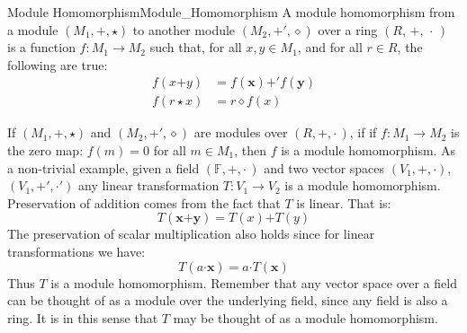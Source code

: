     \begin{fdefinition}{Module Homomorphism}{Module_Homomorphism}
        A \gls{module homomorphism} from a
        \gls{module} $(M_{1},\boldsymbol{+},\star)$ to another module
        $(M_{2},\boldsymbol{+}',\diamond)$ over a \gls{ring}
        $(R,\,+,\,\cdot\,)$ is a \gls{function} $f:M_{1}\rightarrow{M}_{2}$
        such that, for all $x,y\in{M}_{1}$, and for all $r\in{R}$, the
        following are true:
        \begin{align}
            f(x\boldsymbol{+}y)&=f(\mathbf{x})\boldsymbol{+}'f(\mathbf{y})
            \tag{Preservation of Addition}\\
            f(r\star{x})&=r\diamond{f}(x)
            \tag{Preservation of Scalar Multiplication}
        \end{align}
    \end{fdefinition}
    \begin{example}
        If $(M_{1},\boldsymbol{+},\star)$ and $(M_{2},\boldsymbol{+}',\diamond)$
        are modules over $(R,+,\cdot\,)$, if if $f:M_{1}\rightarrow{M}_{2}$ is
        the zero map: $f(m)=0$ for all $m\in{M}_{1}$, then $f$ is a module
        homomorphism. As a non-trivial example, given a field
        $(\mathbb{F},+,\cdot\,)$ and two vector spaces
        $(V_{1},\boldsymbol{+},\boldsymbol{\cdot})$,
        $(V_{1},\boldsymbol{+}',\boldsymbol{\cdot}')$ any linear transformation
        $T:V_{1}\rightarrow{V}_{2}$ is a module homomorphism. Preservation of
        addition comes from the fact that $T$ is linear. That is:
        \begin{equation}
            T(\mathbf{x}\boldsymbol{+}\mathbf{y})
            =T(x)\boldsymbol{+}T(y)
        \end{equation}
        The preservation of scalar multiplication also holds since for linear
        transformations we have:
        \begin{equation}
            T(a\boldsymbol{\cdot}\mathbf{x})
            =a\boldsymbol{\cdot}{T}(\mathbf{x})
        \end{equation}
        Thus $T$ is a module homomorphism. Remember that any vector space over
        a field can be thought of as a module over the underlying field, since
        any field is also a ring. It is in this sense that $T$ may be thought of
        as a module homomorphism.
    \end{example}
